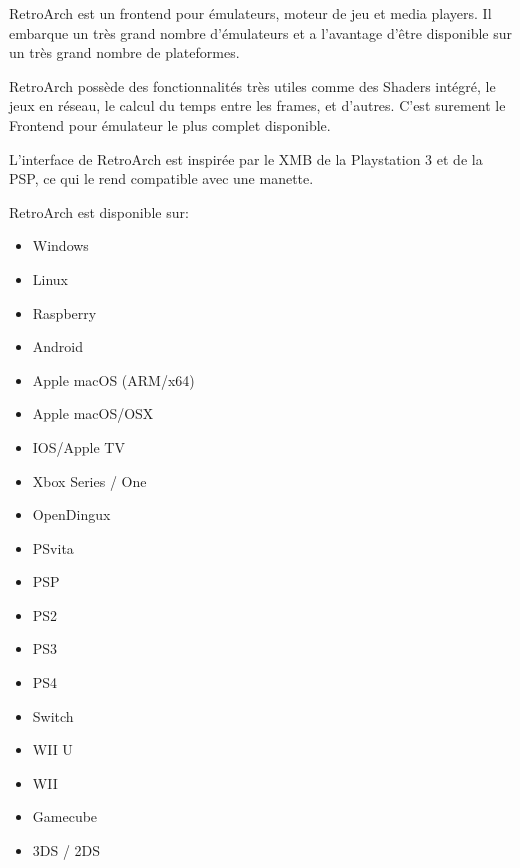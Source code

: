 \documentclass[a4paper,12pt,french]{sphinxmanual}
\begin{document}
\sphinxAtStartPar
RetroArch est un frontend pour émulateurs, moteur de jeu et media players. Il embarque un très grand nombre d’émulateurs et a l’avantage d’être disponible sur un très grand nombre de plateformes.

\sphinxAtStartPar
RetroArch possède des fonctionnalités très utiles comme des Shaders intégré, le jeux en réseau, le calcul du temps entre les frames, et d’autres. C’est surement le Frontend pour émulateur le plus complet disponible.

\sphinxAtStartPar
L’interface de RetroArch est inspirée par le XMB de la Playstation 3 et de la PSP, ce qui le rend compatible avec une manette.

\sphinxAtStartPar
RetroArch est disponible sur:
\begin{itemize}
\item {} 
\sphinxAtStartPar
Windows

\item {} 
\sphinxAtStartPar
Linux

\item {} 
\sphinxAtStartPar
Raspberry

\item {} 
\sphinxAtStartPar
Android

\item {} 
\sphinxAtStartPar
Apple macOS (ARM/x64)

\item {} 
\sphinxAtStartPar
Apple macOS/OSX

\item {} 
\sphinxAtStartPar
IOS/Apple TV

\item {} 
\sphinxAtStartPar
Xbox Series / One

\item {} 
\sphinxAtStartPar
OpenDingux

\item {} 
\sphinxAtStartPar
PSvita

\item {} 
\sphinxAtStartPar
PSP

\item {} 
\sphinxAtStartPar
PS2

\item {} 
\sphinxAtStartPar
PS3

\item {} 
\sphinxAtStartPar
PS4

\item {} 
\sphinxAtStartPar
Switch

\item {} 
\sphinxAtStartPar
WII U

\item {} 
\sphinxAtStartPar
WII

\item {} 
\sphinxAtStartPar
Gamecube

\item {} 
\sphinxAtStartPar
3DS / 2DS

\end{itemize}
\end{document}
